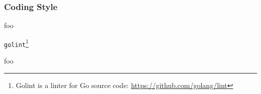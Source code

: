 
\subsubsection{Coding Style}














foo

\texttt{golint}\footnote{Golint is a linter for Go source code: \url{https://github.com/golang/lint}}

%

foo
